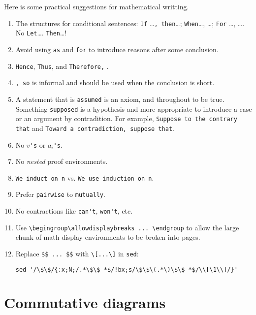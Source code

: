 \documentclass[12pt]{amsart}
\theoremstyle{plain}
\theoremstyle{definition}
\theoremstyle{remark}
\numberwithin{equation}{section} %
\begin{document}
Here is some practical suggestions for mathematical writting.
\begin{enumerate}
	\item The structures for conditional sentences: \verb|If| \ldots\verb|, then|\ldots; \verb|When|\ldots, \ldots; \verb|For| \ldots, \ldots. No \verb|Let|\ldots. \verb|Then|\ldots!

	\item Avoid using \verb|as| and \verb|for| to introduce reasons after some conclusion.

	\item \verb|Hence|, \verb|Thus|, and \verb|Therefore,| .

	\item \verb|, so| is informal and should be used when the conclusion is short.

	\item A statement that is \verb|assumed| is an axiom, and throughout to be true. Something \verb|supposed| is a hypothesis and more appropriate to introduce a case or an argument by contradition. For example, \verb|Suppose to the contrary that| and \verb|Toward a contradiction, suppose that|.

	\item No $ v $\verb|'s| or $ a_{i} $\verb|'s|.

	\item No \textit{nested} proof environments.

	\item \verb|We induct on n| vs. \verb|We use induction on n|.

	\item Prefer \verb|pairwise| to \verb|mutually|.

	\item No contractions like \verb|can't|, \verb|won't|, etc.
	
	\item Use \verb|\begingroup\allowdisplaybreaks ... \endgroup| to allow the large chunk of math display environments to be broken into pages.
	
	\item Replace \verb|$$ ... $$| with \verb|\[...\]| in \verb|sed|:
	
	\verb|sed '/\$\$/{:x;N;/.*\$\$ *$/!bx;s/\$\$\(.*\)\$\$ *$/\\[\1\\]/}'|

\end{enumerate}

\section{Commutative diagrams}
\end{document}
